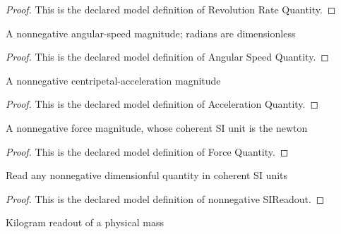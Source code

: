 \begin{proof}
  This is the declared model definition of Revolution Rate Quantity.
\end{proof}
\begin{definition}
  \label{def:physics:phyx-mini-0806:phyxminiproblems-problemphyxmini0806-angularspeedquantity}
  A nonnegative angular-speed magnitude; radians are dimensionless
\end{definition}
\begin{proof}
  This is the declared model definition of Angular Speed Quantity.
\end{proof}
\begin{definition}
  \label{def:physics:phyx-mini-0806:phyxminiproblems-problemphyxmini0806-accelerationquantity}
  A nonnegative centripetal-acceleration magnitude
\end{definition}
\begin{proof}
  This is the declared model definition of Acceleration Quantity.
\end{proof}
\begin{definition}
  \label{def:physics:phyx-mini-0806:phyxminiproblems-problemphyxmini0806-forcequantity}
  A nonnegative force magnitude, whose coherent SI unit is the newton
\end{definition}
\begin{proof}
  This is the declared model definition of Force Quantity.
\end{proof}
\begin{definition}
  \label{def:physics:phyx-mini-0806:phyxminiproblems-problemphyxmini0806-nonnegativesireadout}
  Read any nonnegative dimensionful quantity in coherent SI units
\end{definition}
\begin{proof}
  This is the declared model definition of nonnegative SIReadout.
\end{proof}
\begin{definition}
  \label{def:physics:phyx-mini-0806:phyxminiproblems-problemphyxmini0806-massinkilograms}
  Kilogram readout of a physical mass
\end{definition}
